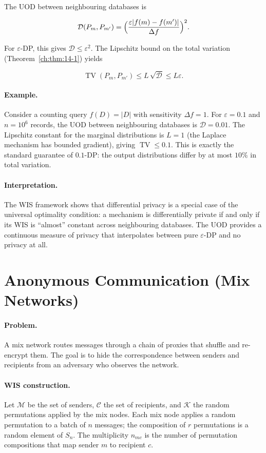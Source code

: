 The UOD between neighbouring databases is

\[
\mathcal D(P_m,P_{m'}) = \Bigl(\frac{\varepsilon|f(m)-f(m')|}{\Delta f}\Bigr)^2.
\]

For $\varepsilon$-DP, this gives $\mathcal D\le\varepsilon^2$.
The Lipschitz bound on the total variation (Theorem~\ref{ch:thm:14-1}) yields

\[
\operatorname{TV}(P_m,P_{m'}) \le L\,\sqrt{\mathcal D}
\le L\varepsilon.
\]

\paragraph{Example.}
Consider a counting query $f(D)=|D|$ with sensitivity $\Delta f=1$.
For $\varepsilon=0.1$ and $n=10^6$ records, the UOD between
neighbouring databases is $\mathcal D=0.01$.  The Lipschitz
constant for the marginal distributions is $L=1$ (the Laplace
mechanism has bounded gradient), giving
$\operatorname{TV}\le 0.1$.  This is exactly the standard
guarantee of $0.1$-DP: the output distributions differ by at most
$10\%$ in total variation.

\paragraph{Interpretation.}
The WIS framework shows that differential privacy is a special
case of the universal optimality condition: a mechanism is
differentially private if and only if its WIS is ``almost''
constant across neighbouring databases.  The UOD provides a
continuous measure of privacy that interpolates between pure
$\varepsilon$-DP and no privacy at all.

\section{Anonymous Communication (Mix Networks)}\label{ch:sec:anonymous-communication-mix-networks}
\label{sec:app-mix}

\paragraph{Problem.}
A mix network \cite{chaum1981untraceable} routes messages through a chain of
proxies that shuffle and re-encrypt them.  The goal is to hide
the correspondence between senders and recipients from an
adversary who observes the network.

\paragraph{WIS construction.}
Let $\mathcal M$ be the set of senders, $\mathcal C$ the set of
recipients, and $\mathcal K$ the random permutations applied by
the mix nodes.  Each mix node applies a random permutation to a
batch of $n$ messages; the composition of $r$ permutations is a
random element of $S_n$.  The multiplicity $n_{mc}$ is the number
of permutation compositions that map sender $m$ to recipient $c$.

